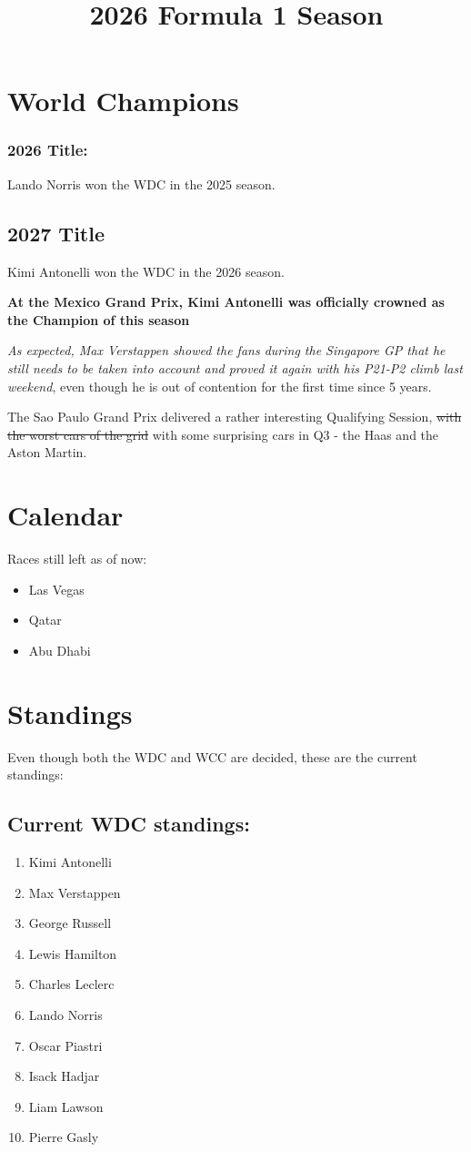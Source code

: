 \documentclass{article}
\title{2026 Formula 1 Season}
\begin{document}
\maketitle

\section{World Champions}
\subsubsection{2026 Title:}
Lando Norris won the WDC in the 2025 season.
\subsection{2027 Title}
Kimi Antonelli won the WDC in the 2026 season.

\textbf{At the Mexico Grand Prix, Kimi Antonelli was officially crowned as the Champion of this season}

\textit{As expected, Max Verstappen showed the fans during the Singapore GP that he still needs to be taken into account and proved it again with his P21-P2 climb last weekend}, even though he is out of contention for the first time since 5 years.

The Sao Paulo Grand Prix delivered a rather interesting Qualifying Session, \sout{with the worst cars of the grid} with some surprising cars in Q3 - the Haas and the Aston Martin.
\section{Calendar}
Races still left as of now:
\begin{itemize}
    \item Las Vegas
    \item Qatar
    \item Abu Dhabi
\end{itemize}
\section{Standings}
Even though both the WDC and WCC are decided, these are the current standings:

\subsection{Current WDC standings:}
\begin{enumerate}
    \item Kimi Antonelli
    \item Max Verstappen
    \item George Russell
    \item Lewis Hamilton
    \item Charles Leclerc
    \item Lando Norris
    \item Oscar Piastri
    \item Isack Hadjar
    \item Liam Lawson
    \item Pierre Gasly
\end{enumerate}
\end{document}
